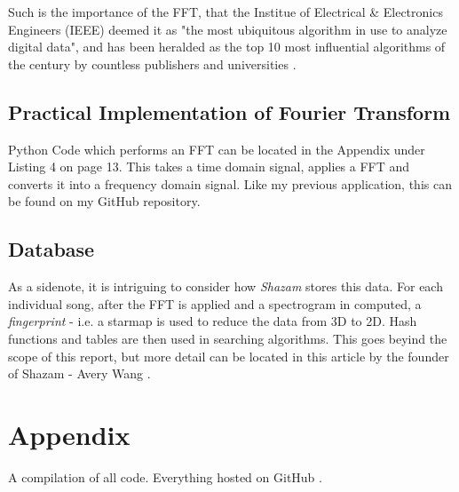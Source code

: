 \documentclass[a4paper,12pt]{article}
\begin{document}
Such is the importance of the FFT, that the Institue of Electrical \& Electronics Engineers (IEEE)  deemed it as "the most ubiquitous algorithm
in use to analyze digital data", and has been heralded as the top 10 most
influential algorithms of the century by countless publishers and universities \parencite{AlgorithmQuoteft}.

\subsection{Practical Implementation of Fourier Transform}
\label{FTimplementation}

Python Code which performs an FFT can be located in the Appendix under Listing 4 on page 13. This takes a time domain signal, applies a FFT and converts it into a frequency domain signal. Like my previous application, this can be found on my GitHub repository.

\subsection{Database}
As a sidenote, it is intriguing to consider how \textit{Shazam} stores this data. For each individual song, after the FFT is applied and a spectrogram in computed, a \textit{fingerprint} - i.e. a starmap is used to reduce the data
from 3D to 2D. Hash functions and tables are then used in searching algorithms. This goes beyind the scope of this report, but more detail can be located in this article by the founder of Shazam - Avery Wang \parencite{AveryWang}.

\section{Appendix}
\label{Appendix}
A compilation of all code. Everything hosted on GitHub \parencite{GitHubRepo}.
\newpage

%


\newpage



\end{document}

